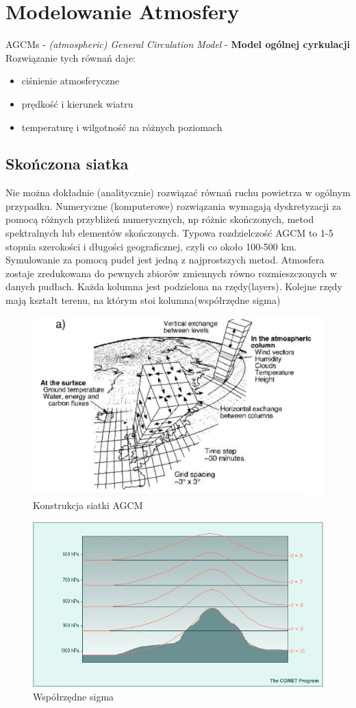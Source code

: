 \documentclass{article}
\theoremstyle{plain}
\begin{document}
\section{Modelowanie Atmosfery}
AGCMs - \textit{(atmospheric) General Circulation Model} - \textbf{Model ogólnej cyrkulacji}
	Rozwiązanie tych równań daje:
	\begin{itemize}
		\item ciśnienie atmosferyczne
		\item prędkość i kierunek wiatru
		\item temperaturę i wilgotność na różnych poziomach
	\end{itemize}
\subsection{Skończona siatka}
	Nie można dokładnie (analitycznie) rozwiązać równań ruchu powietrza w ogólnym przypadku. Numeryczne (komputerowe) rozwiązania wymagają dyskretyzacji za pomocą różnych przybliżeń numerycznych, np różnic skończonych, metod spektralnych lub elementów skończonych. Typowa rozdzielczość AGCM to 1-5 stopnia szerokości i długości geograficznej, czyli co około 100-500 km.
	Symulowanie za pomocą pudeł jest jedną z najprostszych metod. Atmosfera zostaje zredukowana do pewnych zbiorów zmiennych równo rozmieszczonych w danych pudłach. Każda kolumna jest podzielona na rzędy(layers). Kolejne rzędy mają kształt terenu, na którym stoi kolumna(współrzędne sigma)
\begin{figure}[h!]
\begin{center}
	\includegraphics[width=0.7\linewidth]{images/Figure3}
	\caption{Konstrukcja siatki AGCM}
\end{center}
\end{figure}
\begin{figure}[h!]
\begin{center}
	\includegraphics[width=0.7\linewidth]{images/Figure4}
	\caption{Współrzędne sigma}
\end{center}
\end{figure}
\end{document}
